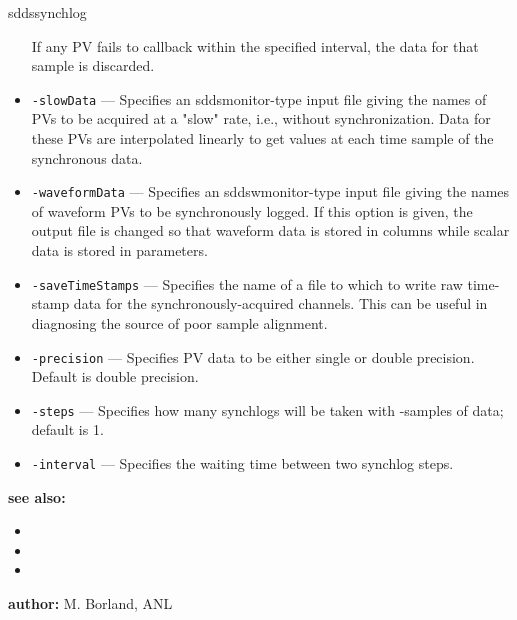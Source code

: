 \begin{sddsprog}{sddssynchlog}
\begin{itemize}
                If any PV fails to callback within the specified interval, the data for
                that sample is discarded.
        \item {\tt -slowData} --- Specifies an sddsmonitor-type input file giving the names of PVs to be
                acquired at a "slow" rate, i.e., without synchronization.  Data for these PVs
                are interpolated linearly to get values at each time sample of the synchronous
                data.
        \item {\tt -waveformData} --- Specifies an sddswmonitor-type input file giving the names of waveform PVs to
                be synchronously logged.  If this option is given, the output file is changed
                so that waveform data is stored in columns while scalar data is stored in
                parameters.
        \item {\tt -saveTimeStamps} --- Specifies the name of a file to which to write raw time-stamp data for the
                synchronously-acquired channels.  This can be useful in diagnosing the source
                of poor sample alignment.
        \item {\tt -precision} --- Specifies PV data to be either single or double precision.  Default is double precision.
        \item {\tt -steps} --- Specifies how many synchlogs will be taken with -samples of data; default is 1.
        \item {\tt -interval} --- Specifies the waiting time between two synchlog steps.
    \end{itemize}

\item \textbf{see also:}
    \begin{itemize}
    \item {}
    \item {}
    \item {}
    \end{itemize}
\item \textbf{author:} M. Borland, ANL 
\end{sddsprog}
